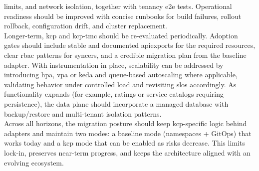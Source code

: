 \documentclass[11pt, a4paper, oneside, listof=totoc]{scrartcl}
\begin{document}
            limits, and network isolation, together with tenancy \gls{e2e} tests.
            Operational readiness should be improved with concise runbooks for build failures,
            rollout rollback, configuration drift, and cluster replacement.\\
            Longer-term, \gls{kcp} and \gls{kcp}-\gls{tmc} should be re-evaluated periodically.
            Adoption gates should include stable and documented \gls{apiexport}s for the required
            resources, clear \gls{rbac} patterns for syncers, and a credible migration plan from the
            baseline adapter.
            With instrumentation in place, scalability can be addressed by introducing \gls{hpa},
            \gls{vpa} or \gls{keda} and queue-based autoscaling where applicable, validating
            behavior under controlled load and revisiting \glspl{slo} accordingly.
            As functionality expands (for example, ratings or service catalogs requiring
            persistence), the data plane should incorporate a managed database with backup/restore
            and multi-tenant isolation patterns.\\
            Across all horizons, the migration posture should keep \gls{kcp}-specific logic behind
            adapters and maintain two modes: a baseline mode (namespaces + GitOps) that works today
            and a \gls{kcp} mode that can be enabled as risks decrease.
            This limits lock-in, preserves near-term progress, and keeps the architecture aligned
            with an evolving ecosystem.

    \cleardoublepage
    \printbibliography[
        title = {References},
        heading = bibintoc
    ]

    \cleardoublepage
    \appendix

\end{document}
